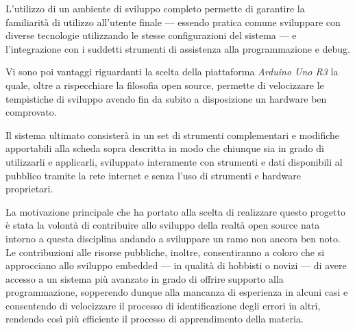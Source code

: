 L'utilizzo di un ambiente di sviluppo completo permette di garantire la familiarità di utilizzo all'utente finale --- essendo pratica comune sviluppare con diverse tecnologie utilizzando le stesse configurazioni del sistema --- e l'integrazione con i suddetti strumenti di assistenza alla programmazione e debug.

Vi sono poi vantaggi riguardanti la scelta della piattaforma \textit{Arduino Uno R3} la quale, oltre a rispecchiare la filosofia open source, permette di velocizzare le tempistiche di sviluppo avendo fin da subito a disposizione un hardware ben comprovato\cite{site:arduino-mini-le}.

Il sistema ultimato consisterà in un set di strumenti complementari e modifiche apportabili alla scheda sopra descritta in modo che chiunque sia in grado di utilizzarli e applicarli, sviluppato interamente con strumenti e dati disponibili al pubblico tramite la rete internet e senza l'uso di strumenti e hardware proprietari.

La motivazione principale che ha portato alla scelta di realizzare questo progetto è stata la volontà di contribuire allo sviluppo della realtà open source nata intorno a questa disciplina andando a sviluppare un ramo non ancora ben noto. 
Le contribuzioni alle risorse pubbliche, inoltre, consentiranno a coloro che si approcciano allo sviluppo embedded --- in qualità di hobbisti o novizi --- di avere accesso a un sistema più avanzato in grado di offrire supporto alla programmazione, sopperendo dunque alla mancanza di esperienza in alcuni casi e consentendo di velocizzare il processo di identificazione degli errori in altri, rendendo così più efficiente il processo di apprendimento della materia.